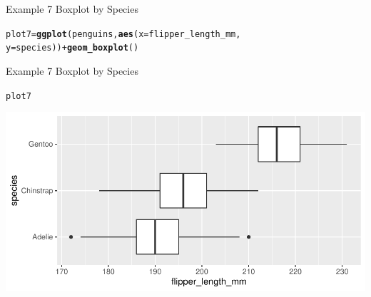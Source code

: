 \documentclass{beamer}\usepackage[]{graphicx}\usepackage[]{xcolor}
\makeatletter
\newcommand{\hlopt}[1]{\textcolor[rgb]{0,0,0}{#1}}%
\newcommand{\hlstd}[1]{\textcolor[rgb]{0.345,0.345,0.345}{#1}}%
\newcommand{\hlkwb}[1]{\textcolor[rgb]{0.69,0.353,0.396}{#1}}%
\newcommand{\hlkwc}[1]{\textcolor[rgb]{0.333,0.667,0.333}{#1}}%
\newcommand{\hlkwd}[1]{\textcolor[rgb]{0.737,0.353,0.396}{\textbf{#1}}}%
\newenvironment{kframe}{%
 \def\at@end@of@kframe{}%
 \ifinner\ifhmode%
  \def\at@end@of@kframe{\end{minipage}}%
  \begin{minipage}{\columnwidth}%
 \fi\fi%
 \def\FrameCommand##1{\hskip\@totalleftmargin \hskip-\fboxsep
 \colorbox{shadecolor}{##1}\hskip-\fboxsep
     \hskip-\linewidth \hskip-\@totalleftmargin \hskip\columnwidth}%
 \MakeFramed {\advance\hsize-\width
   \@totalleftmargin\z@ \linewidth\hsize
   \@setminipage}}%
 {\par\unskip\endMakeFramed%
 \at@end@of@kframe}
\newenvironment{knitrout}{}{} %
\makeatother
\begin{document}
\begin{frame}[fragile]{Example 7 Boxplot by Species}
\begin{knitrout}
\color{fgcolor}\begin{kframe}
\begin{alltt}
\hlstd{plot7} \hlkwb{=} \hlkwd{ggplot}\hlstd{(penguins,} \hlkwd{aes}\hlstd{(}\hlkwc{x} \hlstd{= flipper_length_mm,}
    \hlkwc{y} \hlstd{= species))} \hlopt{+} \hlkwd{geom_boxplot}\hlstd{()}
\end{alltt}
\end{kframe}
\end{knitrout}

\end{frame}

\begin{frame}[fragile]{Example 7 Boxplot by Species}
\begin{knitrout}
\color{fgcolor}\begin{kframe}
\begin{alltt}
\hlstd{plot7}
\end{alltt}
\end{kframe}
\includegraphics[width=0.95\linewidth]{figure/unnamed-chunk-35-1} 
\end{knitrout}

\end{frame}
\end{document}
